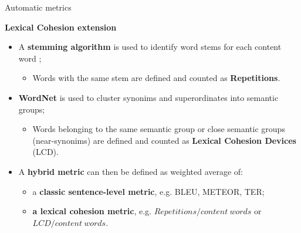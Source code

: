 \begin{frame}{Automatic metrics}
	
	\textbf{Lexical Cohesion extension} \cite{wong_extending_2012}
	
	\begin{itemize}
		\item A \textbf{stemming algorithm} \cite{porter_algorithm_1980} is used to identify word stems for each content word  ; 
		\begin{itemize}
			\item Words with the same stem are defined and counted as \textbf{Repetitions}.
		\end{itemize}
		\item \textbf{WordNet} \cite{fellbaum_semantic_1998} is used to cluster synonims and superordinates into  semantic groups;
		\begin{itemize}
			\item Words belonging to the same semantic group or close semantic groups (near-synonims) are defined and counted as \textbf{Lexical Cohesion Devices} (LCD).
		\end{itemize}
		\item A \textbf{hybrid metric} can then be defined as weighted average of:		
			\begin{itemize}
				\item a \textbf{classic sentence-level metric}, e.g. BLEU, METEOR, TER;
				\item \textbf{a lexical cohesion metric}, e.g. $Repetitions / content\ words$ or $LCD / content\ words$.
			\end{itemize}
		
		
	\end{itemize}
	
\end{frame}



